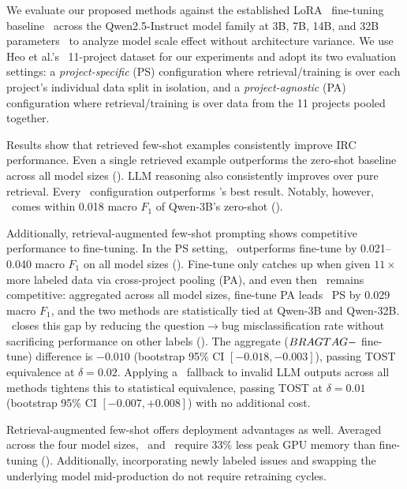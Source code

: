 We evaluate our proposed methods against the established LoRA~\cite{hu2022lora} fine-tuning baseline~\cite{heo2025study, aracena2025applying, aracena2024applyinglargelanguagemodels} across the Qwen2.5-Instruct model family at 3B, 7B, 14B, and 32B parameters~\cite{yang2024qwen25} to analyze model scale effect without architecture variance. We use Heo et al.'s~\cite{heo2025study} 11-project dataset for our experiments and adopt its two evaluation settings: a \emph{project-specific} (PS) configuration where retrieval/training is over each project's individual data split in isolation, and a \emph{project-agnostic} (PA) configuration where retrieval/training is over data from the 11 projects pooled together.

Results show that retrieved few-shot examples consistently improve IRC performance. Even a single retrieved example outperforms the zero-shot baseline across all model sizes (). LLM reasoning also consistently improves over pure retrieval. Every \ragtag\ configuration outperforms \votag's best result. Notably, however, \votag\ comes within 0.018 macro $F_1$ of Qwen-3B's zero-shot ().

Additionally, retrieval-augmented few-shot prompting shows competitive performance to fine-tuning. In the PS setting, \ragtag\ outperforms fine-tune by 0.021--0.040 macro $F_1$ on all model sizes (). Fine-tune only catches up when given $11\times$ more labeled data via cross-project pooling (PA), and even then \ragtag\ remains competitive: aggregated across all model sizes, fine-tune PA leads \ragtag\ PS by 0.029 macro $F_1$, and the two methods are statistically tied at Qwen-3B and Qwen-32B. \bragtag\ closes this gap by reducing the question$\rightarrow$bug misclassification rate without sacrificing performance on other labels (). The aggregate ($BRAGTAG - $ fine-tune) difference is $-0.010$ (bootstrap 95\% CI $[-0.018, -0.003]$), passing TOST equivalence at $\delta{=}0.02$. Applying a \votag\ fallback to invalid LLM outputs across all methods tightens this to statistical equivalence, passing TOST at $\delta{=}0.01$ (bootstrap 95\% CI $[-0.007, +0.008]$) with no additional cost.

Retrieval-augmented few-shot offers deployment advantages as well. Averaged across the four model sizes, \ragtag\ and \bragtag\ require 33\% less peak GPU memory than fine-tuning (). Additionally, incorporating newly labeled issues and swapping the underlying model mid-production do not require retraining cycles.

